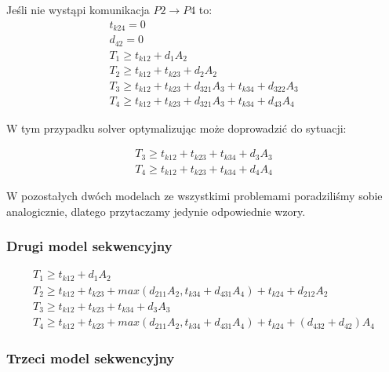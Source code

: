 Jeśli nie wystąpi komunikacja $P2 \to P4$ to:
\begin{equation}
\begin{array}{l}
t_{k24} = 0 \\
d_{42} = 0 \\
T_{1} \geq t_{k12} + d_{1}A_{2} \\
T_{2} \geq t_{k12} + t_{k23} + d_{2}A_{2} \\
T_{3} \geq t_{k12} + t_{k23} + d_{321}A_{3} + t_{k34} + d_{322}A_{3} \\
T_{4} \geq t_{k12} + t_{k23} + d_{321}A_{3} + t_{k34} + d_{43}A_{4}
\end{array}
\end{equation}

W tym przypadku solver optymalizując może doprowadzić do sytuacji:

\begin{equation}
\begin{array}{l}
T_{3} \geq t_{k12} + t_{k23} + t_{k34} + d_{3}A_{3} \\
T_{4} \geq t_{k12} + t_{k23} + t_{k34} + d_{4}A_{4}
\end{array}
\end{equation}

W pozostałych dwóch modelach ze wszystkimi problemami poradziliśmy sobie analogicznie, dlatego przytaczamy jedynie odpowiednie wzory.

\subsubsection{Drugi model sekwencyjny}

\begin{equation} \label{eq:sek2}
\begin{array}{l}
T_{1} \geq t_{k12} + d_{1}A_{2} \\
T_{2} \geq t_{k12} + t_{k23} + max(d_{211}A_{2}, t_{k34} + d_{431}A_{4}) + t_{k24} + d_{212}A_{2} \\
T_{3} \geq t_{k12} + t_{k23} + t_{k34} + d_{3}A_{3} \\
T_{4} \geq t_{k12} + t_{k23} + max(d_{211}A_{2}, t_{k34} + d_{431}A_{4}) + t_{k24} + (d_{432} + d_{42})A_{4}
\end{array} 
\end{equation}

\subsubsection{Trzeci model sekwencyjny}

